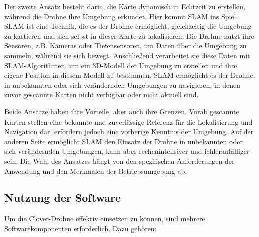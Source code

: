 Der zweite Ansatz besteht darin, die Karte dynamisch in Echtzeit zu erstellen, während die Drohne ihre Umgebung erkundet. Hier kommt SLAM ins Spiel. SLAM ist eine Technik, die es der Drohne ermöglicht, gleichzeitig die Umgebung zu kartieren und sich selbst in dieser Karte zu lokalisieren. Die Drohne nutzt ihre Sensoren, z.B. Kameras oder Tiefensensoren, um Daten über die Umgebung zu sammeln, während sie sich bewegt. Anschließend verarbeitet sie diese Daten mit SLAM-Algorithmen, um ein 3D-Modell der Umgebung zu erstellen und ihre eigene Position in diesem Modell zu bestimmen. SLAM ermöglicht es der Drohne, in unbekannten oder sich verändernden Umgebungen zu navigieren, in denen zuvor gescannte Karten nicht verfügbar oder nicht aktuell sind.

Beide Ansätze haben ihre Vorteile, aber auch ihre Grenzen. Vorab gescannte Karten stellen eine bekannte und zuverlässige Referenz für die Lokalisierung und Navigation dar, erfordern jedoch eine vorherige Kenntnis der Umgebung. Auf der anderen Seite ermöglicht SLAM den Einsatz der Drohne in unbekannten oder sich verändernden Umgebungen, kann aber rechenintensiver und fehleranfälliger sein. Die Wahl des Ansatzes hängt von den spezifischen Anforderungen der Anwendung und den Merkmalen der Betriebsumgebung ab.



\subsection{Nutzung der Software} \label{nutzung_der_software:subsection}

Um die Clover-Drohne effektiv einsetzen zu können, sind mehrere Softwarekomponenten erforderlich. Dazu gehören:

